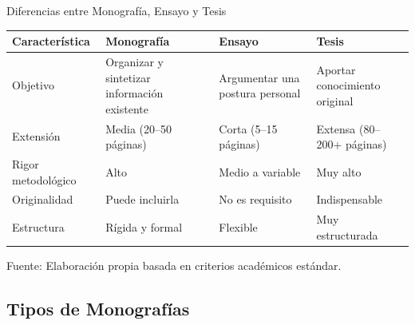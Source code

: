 \documentclass[xcolor=table,aspectratio=169,11pt]{beamer}
\begin{document}
\begin{frame}{Diferencias entre Monografía, Ensayo y Tesis}
	\centering
	\vspace{0.3cm}
	
	\begin{table}
		\footnotesize   %
		
		
		\begin{tabular}{>{\RaggedRight}p{2.6cm}>{\RaggedRight}p{3.6cm}>{\RaggedRight}p{3.6cm}>{\RaggedRight}p{3.6cm}}
			
			\toprule
			\rowcolor{azulencabezado!20}
			\textbf{Característica} & \textbf{Monografía} & \textbf{Ensayo} & \textbf{Tesis} \\
			\midrule
			
			Objetivo 
			& Organizar y sintetizar información existente 
			& Argumentar una postura personal 
			& Aportar conocimiento original \\
			
			\midrule
			Extensión 
			& Media (20--50 páginas) 
			& Corta (5--15 páginas) 
			& Extensa (80--200+ páginas) \\
			
			\midrule
			Rigor metodológico 
			& Alto 
			& Medio a variable 
			& Muy alto \\
			
			\midrule
			Originalidad 
			& Puede incluirla 
			& No es requisito 
			& Indispensable \\
			
			\midrule
			Estructura 
			& Rígida y formal 
			& Flexible 
			& Muy estructurada \\
			
			\bottomrule
		\end{tabular}
		
	\end{table}
	
	\vspace{0.4cm}
	\scriptsize Fuente: Elaboración propia basada en criterios académicos estándar.
	\end{frame}
	
	\subsection{Tipos de Monografías}
	
\end{document}
